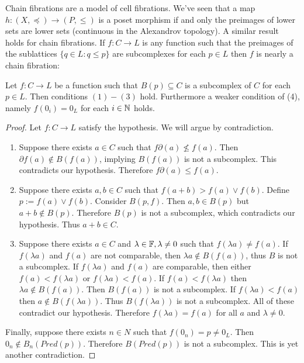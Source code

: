 Chain fibrations are a model of cell fibrations.  We've seen that a map $h:(X,\preceq)\to (P,\leq)$ is a poset morphism if and only the preimages of lower sets are lower sets (continuous in the Alexandrov topology).  A similar result holds for chain fibrations.  If $f:C\to L$ is any function such that the preimages of the sublattices $\{q\in L:q\leq p\}$ are subcomplexes for each $p\in L$ then $f$ is nearly a chain fibration:

\begin{prop}\label{prop:CFDefEquiv}
Let $f:C\to L$ be a function such that $B(p)\subseteq C$ is a subcomplex of $C$ for each $p\in L$.  Then conditions $(1)-(3)$ hold.  Furthermore a weaker condition of (4), namely $f(0_i) = 0_L$ for each $i\in {\mathbb{N}}$ holds.
\end{prop}
\begin{proof}
Let $f:C\to L$ satisfy the hypothesis. We will argue by contradiction.

\begin{enumerate}
\item  Suppose there exists $a\in C$ such that $f\partial(a) \not\leq f(a)$.   Then $\partial f(a)\not\in B(f(a))$, implying $B(f(a))$ is not a subcomplex.  This contradicts our hypothesis. Therefore $f\partial (a) \leq f(a)$.

\item Suppose there exists $a,b\in C$ such that $f(a+b)>f(a)\vee f(b)$.  Define $p:=f(a)\vee f(b)$.  Consider $B(p,f)$. Then $a,b\in B(p)$ but $a+b\not\in B(p)$.  Therefore $B(p)$ is not a subcomplex, which contradicts our hypothesis.  Thus $a+b \in C$.

\item Suppose there exists $a\in C$ and $\lambda\in {\mathbb{F}}, \lambda\neq 0$ such that $f(\lambda a)\neq f(a)$.  If $f(\lambda a)$ and $f(a)$ are not comparable, then $\lambda a \not\in B(f(a))$, thus $B$ is not a subcomplex.  If $f(\lambda a)$ and $f(a)$ are comparable, then either  $f( a ) < f(\lambda a)$ or $f(\lambda a)< f(a)$.  If $f(a)<f(\lambda a)$ then $\lambda a\not\in B(f(a))$.  Then $B(f(a))$ is not a subcomplex.  If $f(\lambda a)< f(a)$ then $a\not\in B(f(\lambda a))$.  Thus $B(f(\lambda a))$ is not a subcomplex.  All of these contradict our hypothesis.  Therefore $f(\lambda a ) = f(a)$ for all $a$ and $\lambda \neq 0$.
\end{enumerate}

 Finally, suppose there exists $n\in N$ such that $f(0_n)=p\neq 0_L$.  Then $0_n\not\in B_n(Pred(p))$.  Therefore $B(Pred(p))$ is not a subcomplex.  This is yet another contradiction.

\end{proof}

